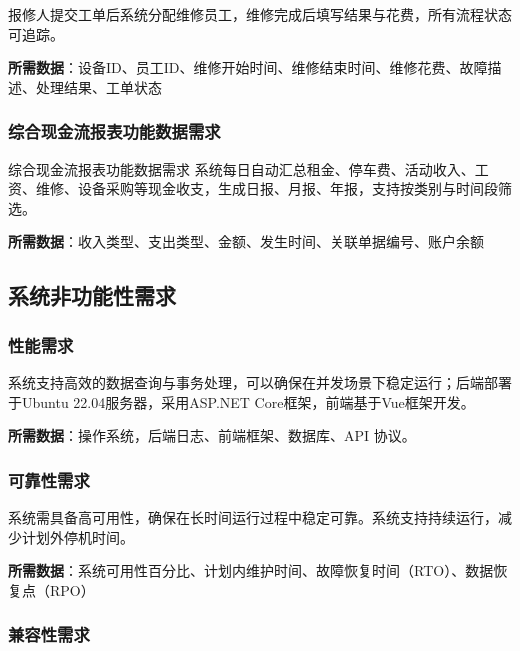 \documentclass[]{article}
\begin{document}
报修人提交工单后系统分配维修员工，维修完成后填写结果与花费，所有流程状态可追踪。

\textbf{所需数据}：设备ID、员工ID、维修开始时间、维修结束时间、维修花费、故障描述、处理结果、工单状态

\hypertarget{ux7efcux5408ux73b0ux91d1ux6d41ux62a5ux8868ux529fux80fdux6570ux636eux9700ux6c42}{%
  \subsubsection{综合现金流报表功能数据需求}\label{ux7efcux5408ux73b0ux91d1ux6d41ux62a5ux8868ux529fux80fdux6570ux636eux9700ux6c42}}

综合现金流报表功能数据需求
系统每日自动汇总租金、停车费、活动收入、工资、维修、设备采购等现金收支，生成日报、月报、年报，支持按类别与时间段筛选。

\textbf{所需数据}：收入类型、支出类型、金额、发生时间、关联单据编号、账户余额

\hypertarget{ux7cfbux7edfux975eux529fux80fdux6027ux9700ux6c42}{%
  \subsection{系统非功能性需求}\label{ux7cfbux7edfux975eux529fux80fdux6027ux9700ux6c42}}

\hypertarget{ux6027ux80fdux9700ux6c42}{%
  \subsubsection{性能需求}\label{ux6027ux80fdux9700ux6c42}}

系统支持高效的数据查询与事务处理，可以确保在并发场景下稳定运行；后端部署于Ubuntu
22.04服务器，采用ASP.NET Core框架，前端基于Vue框架开发。

\textbf{所需数据}：操作系统，后端日志、前端框架、数据库、API 协议。

\hypertarget{ux53efux9760ux6027ux9700ux6c42}{%
  \subsubsection{可靠性需求}\label{ux53efux9760ux6027ux9700ux6c42}}

系统需具备高可用性，确保在长时间运行过程中稳定可靠。系统支持持续运行，减少计划外停机时间。

\textbf{所需数据}：系统可用性百分比、计划内维护时间、故障恢复时间（RTO）、数据恢复点（RPO）

\hypertarget{ux517cux5bb9ux6027ux9700ux6c42}{%
  \subsubsection{兼容性需求}\label{ux517cux5bb9ux6027ux9700ux6c42}}
\end{document}
